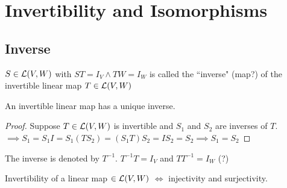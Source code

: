 \section{Invertibility and Isomorphisms}

\subsection{Inverse}
\setcounter{thm}{58}
\begin{mydef}
    $S\in {\mathcal{L}(V,W)}$ with $ST=I_V \wedge TW = I_W$ is called the ``inverse" (map?) of the invertible linear map $T \in {\mathcal{L}(V,W)}$
\end{mydef}

\begin{thm}
    An invertible  linear map has a unique inverse.
\end{thm}
\begin{proof}
    Suppose $T\in {\mathcal{L}(V,W)}$ is invertible and $S_1$ and $S_2$ are inverses of $T$. $\implies S_1 = S_1 I = S_1 (T S_2) = (S_1 T) S_2 = I S_2 = S_2 \implies S_1 = S_2$
\end{proof}

\begin{thm}
    The inverse is denoted by $T^{-1}$. $T^{-1}T=I_V$ and $T T^{-1} = I_W$ (?)
\end{thm}

\begin{thm}
    Invertibility of a linear map $\in {\mathcal{L}(V,W)}$ $\Leftrightarrow$ injectivity and surjectivity.
\end{thm}

